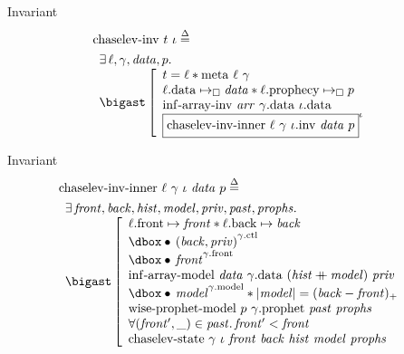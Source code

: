 \begin{frame}{Invariant}
\begin{align*}
		&\mathrm{chaselev \mathhyphen inv}\ t\ \iota
		\eqdef
	\\
		&\begin{array}{l}
				\exists \ell, \gamma, \mathit{data}, p \ldotp
			\\
				\iBigsep\left[\begin{array}{l}
						t = \ell \iSep
						\mathrm{meta}\ \ell\ \gamma
					\\
						\ell\mathrm{.data} \mapsto_\square \mathit{data} \iSep
						\ell\mathrm{.prophecy} \mapsto_\square p
					\\
						\mathrm{inf \mathhyphen array \mathhyphen inv}\ \mathit{arr}\ \gamma\mathrm{.data}\ \iota\mathrm{.data}
					\\
						\iInv{\iota}{\mathrm{chaselev \mathhyphen inv \mathhyphen inner}\ \ell\ \gamma\ \iota\mathrm{.inv}\ \mathit{data}\ p}
				\end{array}\right.
		\end{array}
\end{align*}
\end{frame}


\begin{frame}{Invariant}
\begin{align*}
		&\mathrm{chaselev \mathhyphen inv \mathhyphen inner}\ \ell\ \gamma\ \iota\ \mathit{data}\ p
		\eqdef
	\\
		&\begin{array}{l}
				\exists \mathit{front}, \mathit{back}, \mathit{hist}, \mathit{model}, \mathit{priv}, \mathit{past}, \mathit{prophs} \ldotp
			\\
				\iBigsep\left[\begin{array}{l}
						\ell\mathrm{.front} \mapsto \mathit{front} \iSep
						\ell\mathrm{.back} \mapsto \mathit{back}
					\\
						\iGhost{\gamma\mathrm{.ctl}}{\iAuth{(\mathit{back}, \mathit{priv})}}
					\\
						\iGhost{\gamma\mathrm{.front}}{\iAuth{\mathit{front}}}
					\\
						\mathrm{inf \mathhyphen array \mathhyphen model}\ \mathit{data}\ \gamma\mathrm{.data}\ (\mathit{hist} \mdoubleplus \mathit{model})\ \mathit{priv}
					\\
						\iGhost{\gamma\mathrm{.model}}{\iAuth{\mathit{model}}} \iSep
						| \mathit{model} | = (\mathit{back} - \mathit{front})_+
					\\
						\mathrm{wise \mathhyphen prophet \mathhyphen model}\ p\ \gamma\mathrm{.prophet}\ \mathit{past}\ \mathit{prophs}
					\\
						\forall (\mathit{front'}, \_) \in \mathit{past} \ldotp \mathit{front'} < \mathit{front}
					\\
						\mathrm{chaselev \mathhyphen state}\ \gamma\ \iota\ \mathit{front}\ \mathit{back}\ \mathit{hist}\ \mathit{model}\ \mathit{prophs}
				\end{array}\right.
		\end{array}
\end{align*}
\end{frame}